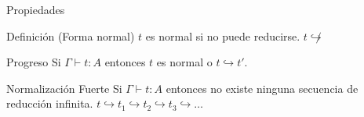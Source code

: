 \begin{frame}{Propiedades}
	\begin{block}{Definición (Forma normal)}
		$t$ es normal si no puede reducirse. $t \not\hookrightarrow$
	\end{block}
	
	\pause
	\begin{block}{Progreso}
		Si $\Gamma \vdash t : A$ entonces $t$ es normal o $t \hookrightarrow t'$.
	\end{block}
	
	\pause
	\begin{block}{Normalización Fuerte}
		Si $\Gamma \vdash t : A$ entonces no existe ninguna secuencia de reducción infinita.
		$t \hookrightarrow t_1 \hookrightarrow t_2 \hookrightarrow t_3 \hookrightarrow \dots$
	\end{block}
\end{frame}